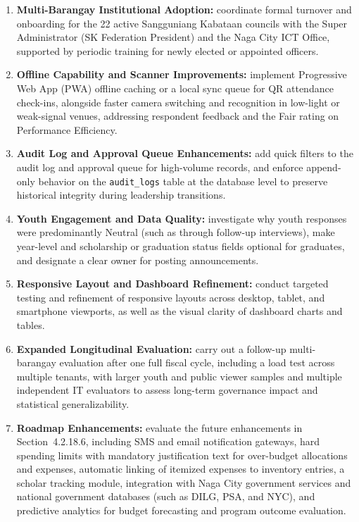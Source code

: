 \begin{enumerate}
    \item \textbf{Multi-Barangay Institutional Adoption:} coordinate formal turnover and onboarding for the 22 active Sangguniang Kabataan councils with the Super Administrator (SK Federation President) and the Naga City ICT Office, supported by periodic training for newly elected or appointed officers.
    \item \textbf{Offline Capability and Scanner Improvements:} implement Progressive Web App (PWA) offline caching or a local sync queue for QR attendance check-ins, alongside faster camera switching and recognition in low-light or weak-signal venues, addressing respondent feedback and the Fair rating on Performance Efficiency.
    \item \textbf{Audit Log and Approval Queue Enhancements:} add quick filters to the audit log and approval queue for high-volume records, and enforce append-only behavior on the \texttt{audit\_logs} table at the database level to preserve historical integrity during leadership transitions.
    \item \textbf{Youth Engagement and Data Quality:} investigate why youth responses were predominantly Neutral (such as through follow-up interviews), make year-level and scholarship or graduation status fields optional for graduates, and designate a clear owner for posting announcements.
    \item \textbf{Responsive Layout and Dashboard Refinement:} conduct targeted testing and refinement of responsive layouts across desktop, tablet, and smartphone viewports, as well as the visual clarity of dashboard charts and tables.
    \item \textbf{Expanded Longitudinal Evaluation:} carry out a follow-up multi-barangay evaluation after one full fiscal cycle, including a load test across multiple tenants, with larger youth and public viewer samples and multiple independent IT evaluators to assess long-term governance impact and statistical generalizability.
    \item \textbf{Roadmap Enhancements:} evaluate the future enhancements in Section~4.2.18.6, including SMS and email notification gateways, hard spending limits with mandatory justification text for over-budget allocations and expenses, automatic linking of itemized expenses to inventory entries, a scholar tracking module, integration with Naga City government services and national government databases (such as DILG, PSA, and NYC), and predictive analytics for budget forecasting and program outcome evaluation.
\end{enumerate}
\vspace{5mm}

